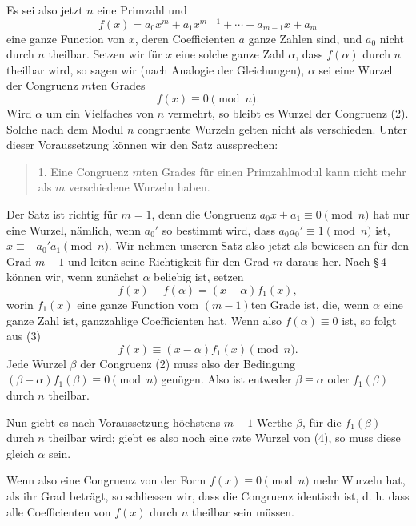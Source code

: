 \documentclass[11pt]{article}
\begin{document}
Es sei also jetzt $n$ eine Primzahl und
\[
\tag{1}        f(x)=a_0x^m+a_1x^{m-1}+\cdots+a_{m-1}x+a_m
\]
eine ganze Function von $x$, deren Coefficienten $a$ ganze Zahlen sind, und $a_0$ nicht durch $n$ theilbar. Setzen wir für $x$ eine solche ganze Zahl $\alpha$, dass $f(\alpha)$ durch $n$ theilbar wird, so sagen wir (nach Analogie der Gleichungen), $\alpha$ sei eine Wurzel der Congruenz $m$ten Grades
\[
\tag{2}        f(x)\equiv0\pmod n.
\]
Wird $\alpha$ um ein Vielfaches von $n$ vermehrt, so bleibt es Wurzel der Congruenz (2). Solche nach dem Modul $n$ congruente Wurzeln gelten nicht als verschieden. Unter dieser Voraussetzung können wir den Satz aussprechen:
\begin{quote}
1. Eine Congruenz $m$ten Grades für einen Primzahlmodul kann nicht mehr als $m$ verschiedene Wurzeln haben.
\end{quote}
Der Satz ist richtig für $m=1$, denn die Congruenz $a_0x+a_1\equiv0\pmod n$ hat nur eine Wurzel, nämlich, wenn $a_0'$ so bestimmt wird, dass $a_0a_0'\equiv1\pmod n$ ist, $x\equiv-a_0'a_1\pmod n$. Wir nehmen unseren Satz also jetzt als bewiesen an für den Grad $m-1$ und leiten seine Richtigkeit für den Grad $m$ daraus her. Nach \S\,4 können wir, wenn zunächst $\alpha$ beliebig ist, setzen
\[
\tag{3}        f(x)-f(\alpha)=(x-\alpha)f_1(x),
\]
worin $f_1(x)$ eine ganze Function vom $(m-1)$ten Grade ist, die, wenn $\alpha$ eine ganze Zahl ist, ganzzahlige Coefficienten hat. Wenn also $f(\alpha)\equiv0$ ist, so folgt aus (3)
\[
\tag{4}        f(x)\equiv(x-\alpha)f_1(x)\pmod n.
\]
Jede Wurzel $\beta$ der Congruenz (2) muss also der Bedingung $(\beta-\alpha)f_1(\beta)\equiv0\pmod n$ genügen. Also ist entweder $\beta\equiv\alpha$ oder $f_1(\beta)$ durch $n$ theilbar.

Nun giebt es nach Voraussetzung höchstens $m-1$ Werthe $\beta$, für die $f_1(\beta)$ durch $n$ theilbar wird; giebt es also noch eine $m$te Wurzel von (4), so muss diese gleich $\alpha$ sein.

Wenn also eine Congruenz von der Form $f(x)\equiv0\pmod n$ mehr Wurzeln hat, als ihr Grad beträgt, so schliessen wir, dass die Congruenz identisch ist, d. h. dass alle Coefficienten von $f(x)$ durch $n$ theilbar sein müssen.
\end{document}
